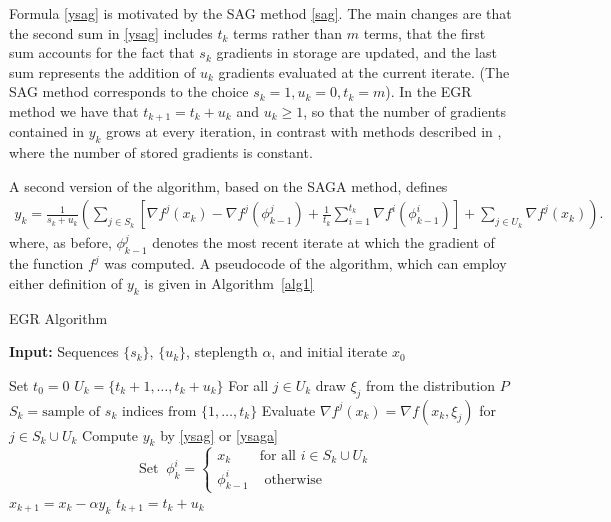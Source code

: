 \documentclass[11pt]{article}
\begin{document}
Formula \eqref{ysag} is motivated by the SAG method \eqref{sag}.   The main changes are that the  second sum in \eqref{ysag}  includes $t_k$ terms rather than $m$ terms, that the first sum accounts for the fact that $s_k$ gradients in storage are updated, and the last sum represents the addition of $ u_k$ gradients evaluated at the current iterate. (The SAG method corresponds to the choice $s_k=1, u_k =0, t_k=m$). In the EGR method we have that $t_{k+1}= t_{k} + u_k$ and $u_k \geq 1$,  so that the number of gradients contained in $y_k$ grows at every iteration, in contrast with methods described in 
\cite{johnson2013accelerating,NIPS2014_5258,shalev2013stochastic,mairal2015incremental,defazio2014finito},
 where the number of stored gradients is constant.
 
A second version of the algorithm, based on the SAGA method, defines 
\begin{align}  \label{ysaga}
      y_k =  \frac{1}{s_k+u_k} \left(  \sum_{j \in S_k} \left[  \nabla f^j(x_{k}) -   \nabla f^j(\phi_{k-1}^j) + \frac{1}{t_{k}} \sum_{i = 1}^{t_{k} }  \nabla f^i (\phi^i_{k-1})  \right] + \sum_{j \in U_k}  \nabla f^j(x_k)\right).
\end{align}
 where, as before,  $\phi_{k-1}^j$ denotes the most recent iterate at which the gradient of the function $f^j$ was computed.
 A pseudocode of the algorithm, which can employ either definition of $y_k$ is given in Algorithm~\ref{alg1}

\bigskip
\begin{algorithm}
	[H] 
	\caption{EGR Algorithm}
	\label{alg1}
	{\bf Input:} Sequences $\{ s_k\}$, $\{ u_k \}$, steplength $ \alpha $, and initial iterate $x_0$
	\begin{algorithmic}
		[1] 
		\State Set $t_{0} = 0$
		\State $U_k =\{t_{k}+1,\ldots, t_{k}+u_k \}$ 
		\State For  all $j \in U_k$ draw $\xi_j$ from the distribution $P$ 
		\State $S_k = \mbox{sample of } s_k \mbox{ indices from }\{ 1, \ldots ,t_{k}\}$ 
           \State Evaluate $\nabla f^j(x_k) = \nabla f(x_k, \xi_j) $ for $j \in S_k \cup U_k$
           \State Compute $y_k$ by \eqref{ysag} or \eqref{ysaga}
		\State
		\begin{equation}  \label{chico} \mbox{Set   }  \  \phi^i_k =
		\begin{cases} 
  x_k & \mbox{for all $i \in S_k\cup U_k$ } \\
  \phi^i_{k-1} & \mbox{ otherwise} 
 \end{cases}
\end{equation}
		\State $x_{k+1} = x_k - \alpha y_k$ 
		\State $t_{k+1} = t_{k} +u_k$ 
		\EndLoop 
	\end{algorithmic}
\end{algorithm}
\end{document}
